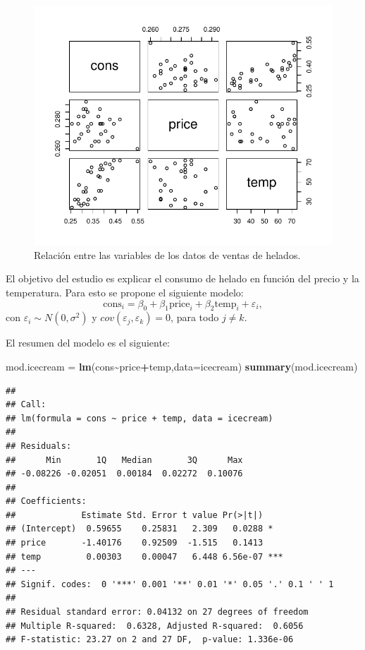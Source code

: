 \documentclass[
]{article}
\newenvironment{Shaded}{\begin{snugshade}}{\end{snugshade}}
\newcommand{\AttributeTok}[1]{\textcolor[rgb]{0.13,0.29,0.53}{#1}}
\newcommand{\FunctionTok}[1]{\textcolor[rgb]{0.13,0.29,0.53}{\textbf{#1}}}
\newcommand{\NormalTok}[1]{#1}
\newcommand{\OtherTok}[1]{\textcolor[rgb]{0.56,0.35,0.01}{#1}}
\newcommand{\SpecialCharTok}[1]{\textcolor[rgb]{0.81,0.36,0.00}{\textbf{#1}}}
\begin{document}
\begin{figure}

{\centering \includegraphics{MLG1_files/figure-latex/Icecream-1} 

}

\caption{\label{fig:icecream} Relación entre las variables de los datos de ventas de helados.}\label{fig:Icecream}
\end{figure}

El objetivo del estudio es explicar el consumo de helado en función del precio y la temperatura. Para esto se propone el siguiente modelo:
\[
\mbox{cons}_{i} = \beta_{0} + \beta_{1}\mbox{price}_{i} + \beta_{2}\mbox{temp}_{i} + \varepsilon_{i},
\]
con \(\varepsilon_{i} \sim N\left(0,\sigma^{2} \right)\) y \(cov(\varepsilon_{j},\varepsilon_{k})=0\), para todo \(j \neq k\).

El resumen del modelo es el siguiente:

\begin{Shaded}
\begin{Highlighting}[]
\NormalTok{  mod.icecream }\OtherTok{=} \FunctionTok{lm}\NormalTok{(cons}\SpecialCharTok{\textasciitilde{}}\NormalTok{price}\SpecialCharTok{+}\NormalTok{temp,}\AttributeTok{data=}\NormalTok{icecream)}
\FunctionTok{summary}\NormalTok{(mod.icecream)}
\end{Highlighting}
\end{Shaded}

\begin{verbatim}
## 
## Call:
## lm(formula = cons ~ price + temp, data = icecream)
## 
## Residuals:
##      Min       1Q   Median       3Q      Max 
## -0.08226 -0.02051  0.00184  0.02272  0.10076 
## 
## Coefficients:
##             Estimate Std. Error t value Pr(>|t|)    
## (Intercept)  0.59655    0.25831   2.309   0.0288 *  
## price       -1.40176    0.92509  -1.515   0.1413    
## temp         0.00303    0.00047   6.448 6.56e-07 ***
## ---
## Signif. codes:  0 '***' 0.001 '**' 0.01 '*' 0.05 '.' 0.1 ' ' 1
## 
## Residual standard error: 0.04132 on 27 degrees of freedom
## Multiple R-squared:  0.6328, Adjusted R-squared:  0.6056 
## F-statistic: 23.27 on 2 and 27 DF,  p-value: 1.336e-06
\end{verbatim}
\end{document}
